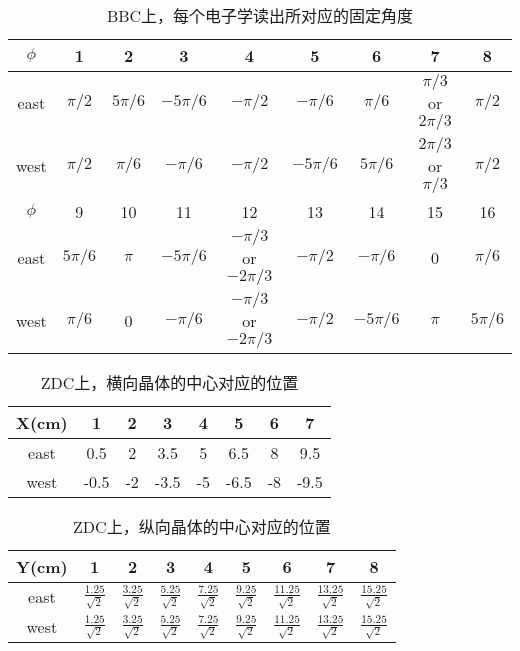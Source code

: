 \begin{table}[htb]
\label{tab:BBC_phi}
\caption{BBC上，每个电子学读出所对应的固定角度}
\begin{tabular}{|c|c|c|c|c|c|c|c|c|}
\hline
\hline
$\phi$  &1        & 2        & 3         & 4         & 5          & 6         & 7                    & 8           \\ \hline
east    &$\pi/2$  & $5\pi/6$ & $-5\pi/6$ & $-\pi/2$  & $-\pi/6$   & $\pi/6$   & $\pi/3$ or $2\pi/3$  & $\pi/2$     \\ \hline
west    &$\pi/2$  & $\pi/6$  & $-\pi/6$  & $-\pi/2$  & $-5\pi/6$  & $5\pi/6$  & $2\pi/3$ or $\pi/3$  & $\pi/2$     \\ \hline
$\phi$  &9        & 10       & 11        & 12                     &13         & 14         & 15      & 16           \\ \hline
east    &$5\pi/6$ & $\pi$    & $-5\pi/6$ & $-\pi/3$ or $-2\pi/3$  & $-\pi/2$  & $-\pi/6$   & 0       & $\pi/6$      \\ \hline
west    &$\pi/6$  & 0        & $-\pi/6$  & $-\pi/3$ or $-2\pi/3$  & $-\pi/2$  & $-5\pi/6$  & $\pi$   & $5\pi/6$    \\ \hline \hline
\end{tabular}
\end{table}

\begin{table}[htb]
\centering
\label{tab:ZDC_phi_x}
\caption{ZDC上，横向晶体的中心对应的位置}
\begin{tabular}{|c|c|c|c|c|c|c|c|}
\hline
\hline
X(cm)   &1    &2  &3    &4  &5    &6  &7      \\ \hline
east    &0.5  &2  &3.5  &5  &6.5  &8  &9.5    \\ \hline
west    &-0.5 &-2 &-3.5 &-5 &-6.5 &-8 &-9.5   \\ \hline \hline
\end{tabular}
\end{table}

\begin{table}[htb]
\centering
\label{tab:ZDC_phi_y}
\caption{ZDC上，纵向晶体的中心对应的位置}
\begin{tabular}{|c|c|c|c|c|c|c|c|c|}
\hline
\hline
Y(cm)   &1               &2             &3              &4              &5              &6               &7               &8    \\ \hline
east    &$\frac{1.25}{\sqrt{2}}$ &$\frac{3.25}{\sqrt{2}}$ &$\frac{5.25}{\sqrt{2}}$ &$\frac{7.25}{\sqrt{2}}$ &$\frac{9.25}{\sqrt{2}}$ &$\frac{11.25}{\sqrt{2}}$ &$\frac{13.25}{\sqrt{2}}$ &$\frac{15.25}{\sqrt{2}}$                    \\ [4pt] \hline
west    &$\frac{1.25}{\sqrt{2}}$ &$\frac{3.25}{\sqrt{2}}$ &$\frac{5.25}{\sqrt{2}}$ &$\frac{7.25}{\sqrt{2}}$ &$\frac{9.25}{\sqrt{2}}$ &$\frac{11.25}{\sqrt{2}}$ &$\frac{13.25}{\sqrt{2}}$ &$\frac{15.25}{\sqrt{2}}$                    \\ [4pt]\hline
\hline
\end{tabular}
\end{table}




